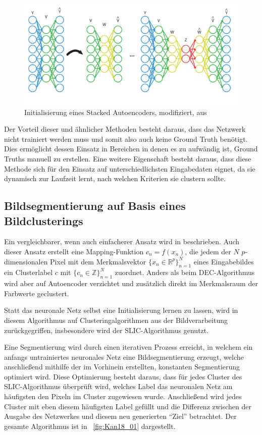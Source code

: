 \begin{figure}[h!]
	\centering
	\includegraphics[width=.8\textwidth,keepaspectratio]{images/BK15_01.png}
	\caption{Initialisierung eines Stacked Autoencoders, modifiziert, aus \cite{berniker_15}}
	\label{fig:sae}
\end{figure}

Der Vorteil dieser und ähnlicher Methoden besteht daraus, dass das Netzwerk nicht trainiert werden muss und somit also auch keine Ground Truth benötigt. Dies ermöglicht dessen Einsatz in Bereichen in denen es zu aufwändig ist, Ground Truths manuell zu erstellen. Eine weitere Eigenschaft besteht daraus, dass diese Methode sich für den Einsatz auf unterschiedlichsten Eingabedaten eignet, da sie dynamisch zur Laufzeit lernt, nach welchen Kriterien sie clustern sollte.

\subsection{Bildsegmentierung auf Basis eines Bildclusterings}
\label{ssec:kanezaki}
Ein vergleichbarer, wenn auch einfacherer Ansatz wird in \cite{kanezaki_18} beschrieben. Auch dieser Ansatz erstellt eine Mapping-Funktion $c_n=f(x_n)$, die jedem der $N$ $p$-dimensionalen Pixel mit dem Merkmalsvektor $\{x_n\in\mathbb{R}^p\}_{n=1}^N$ eines Eingabebildes ein Clusterlabel $c$ mit $\{c_n\in\mathbb{Z}\}_{n=1}^N$ zuordnet. Anders als beim DEC-Algorithmus wird aber auf Autoencoder verzichtet und zusätzlich direkt im Merkmalsraum der Farbwerte geclustert.

Statt das neuronale Netz selbst eine Initialisierung lernen zu lassen, wird in diesem Algorithmus auf Clusteringalgorithmen aus der Bildverarbeitung zurückgegriffen, insbesondere wird der SLIC-Algorithmus \cite{achanta_10} genutzt.

Eine Segmentierung wird durch einen iterativen Prozess erreicht, in welchem ein anfangs untrainiertes neuronales Netz eine Bildsegmentierung erzeugt, welche anschließend mithilfe der im Vorhinein erstellten, konstanten Segmentierung optimiert wird. Diese Optimierung besteht daraus, dass für jedes Cluster des SLIC-Algorithmus überprüft wird, welches Label das neuronalen Netz am häufigsten den Pixeln im Cluster zugewiesen wurde. Anschließend wird jedes Cluster mit eben diesem häufigsten Label gefüllt und die Differenz zwischen der Ausgabe des Netzwerkes und diesem neu generierten \enquote{Ziel} betrachtet.
Der gesamte Algorithmus ist in \figurename~\ref{fig:Kan18_01} dargestellt. 

